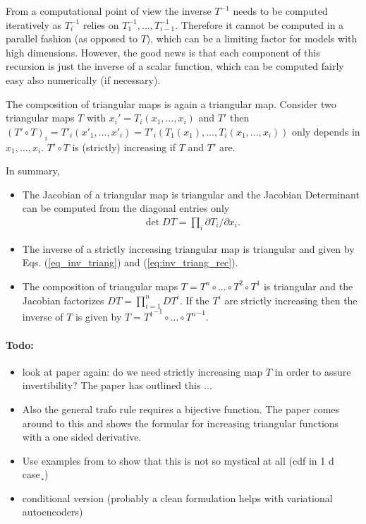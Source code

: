 \documentclass[12pt,a4paper]{article}
\begin{document}
From a computational point of view the inverse $T^{-1}$ needs to be computed iteratively as $T^{-1}_i$ relies on $T^{-1}_{1}, \dots, T^{-1}_{i-1}$. Therefore it cannot be computed in a parallel fashion (as opposed to $T$), which can be a limiting factor for models with high dimensions. However, the good news is that each component of this recursion is just the inverse of a scalar function, which can be computed fairly easy also numerically (if necessary).


The composition of triangular maps is again a triangular map. Consider two triangular maps $T$ with $x_i' = T_i(x_1, \dots, x_i)$ and $T'$ then $(T'\circ T)_i = T'_i(x'_1, \dots, x'_i) = T'_i(T_1(x_1), \dots, T_i(x_1, \dots, x_i))$ only depends in $x_1, \dots, x_i$. $T'\circ T$ is (strictly) increasing if $T$ and $T'$ are.

In summary,
\begin{itemize}
	\item The Jacobian of a triangular map is triangular and the Jacobian Determinant can be computed from the diagonal entries only
	\begin{align} \label{eq:jac_triangular}
		\det DT = \prod_i \partial T_i /\partial x_i.
	\end{align} 
	\item The inverse of  a strictly increasing triangular map is triangular and given by Eqs. (\ref{eq_inv_triang}) and (\ref{eq:inv_triang_rec}).
	\item The composition of triangular maps $T = T^n \circ \dots \circ T^2 \circ T^1 $ is triangular and the Jacobian  factorizes $DT = \prod_{i=1}^{n} DT^i $. If the $T^i$ are strictly increasing then the inverse of $T$  is given by $T = {T^{1}}^{-1} \circ \dots  \circ {T^{n}}^{-1}$. 
\end{itemize}

\paragraph{Todo:} 
\begin{itemize}
\item look at paper again: do we need strictly increasing map $T$ in order to assure invertibility? The paper has outlined this ...
\item Also the general trafo rule \label{eq:pdf_trafo}  requires a bijective function. The paper comes around to this and shows the formular for increasing triangular functions with a one sided derivative.
\item Use examples from \cite{jaini_polynomial_flow_2019} to show that this is not so mystical at all (cdf in 1 d case¸)
 \item conditional version (probably a clean formulation helps with variational autoencoders)
 
\end{itemize}
\end{document}
